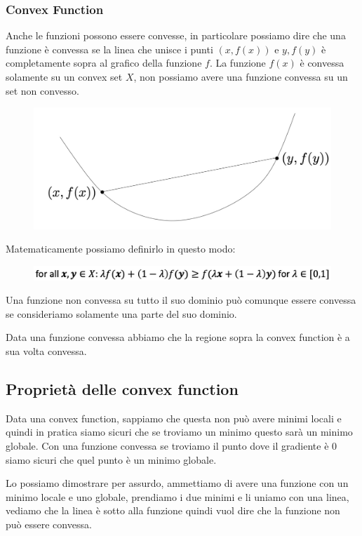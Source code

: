 \documentclass[14pt]{extreport}
\begin{document}
\subsubsection{Convex Function}

Anche le funzioni possono essere convesse, in particolare possiamo dire che una funzione è convessa se la linea che unisce i punti $(x, f(x))$ e $y,
	f(y)$ è completamente sopra al grafico della funzione $f$. La funzione $f(x)$ è convessa solamente su un convex set $X$, non possiamo avere una
	funzione convessa su un set non convesso.


\begin{figure}[H]
	\centering
	\includegraphics[width=0.5\linewidth]{218.jpeg}
\end{figure}

Matematicamente possiamo definirlo in questo modo:

\begin{figure}[H]
	\centering
	\includegraphics[width=0.7\linewidth]{219.jpeg}
\end{figure}

Una funzione non convessa su tutto il suo dominio può comunque essere convessa se consideriamo solamente una parte del suo dominio.

Data una funzione convessa abbiamo che la regione sopra la convex function è a sua volta convessa.

\subsection{Proprietà delle convex function}

Data una convex function, sappiamo che questa non può avere minimi locali e quindi in pratica siamo sicuri che se troviamo un minimo questo sarà un
minimo globale. Con una funzione convessa se troviamo il punto dove il gradiente è 0 siamo sicuri che quel punto è un minimo globale.

Lo possiamo dimostrare per assurdo, ammettiamo di avere una funzione con un minimo locale e uno globale, prendiamo i due minimi e li uniamo con una
linea, vediamo che la linea è sotto alla funzione quindi vuol dire che la funzione non può essere convessa.
\end{document}
